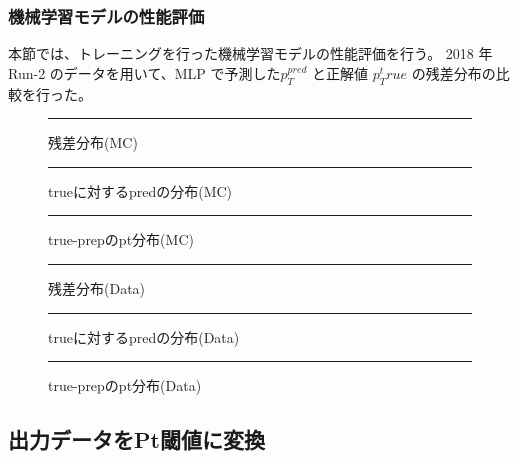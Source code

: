 \subsubsection{機械学習モデルの性能評価}
本節では、トレーニングを行った機械学習モデルの性能評価を行う。
2018 年 Run-2 のデータを用いて、MLP で予測した$p_{T}^{pred}$ と正解値 $p_{T}^true$ の残差分布の比較を行った。

\begin{figure}[tb]
  \centering
  \rule{8cm}{6cm}
  \caption{残差分布(MC)}
  \label{fig:fit_def}
\end{figure}

\begin{figure}[tb]
  \centering
  \rule{8cm}{6cm}
  \caption{trueに対するpredの分布(MC)}
  \label{fig:fit_def}
\end{figure}

\begin{figure}[tb]
  \centering
  \rule{8cm}{6cm}
  \caption{true-prepのpt分布(MC)}
  \label{fig:fit_def}
\end{figure}

\begin{figure}[tb]
  \centering
  \rule{8cm}{6cm}
  \caption{残差分布(Data)}
  \label{fig:fit_def}
\end{figure}

\begin{figure}[tb]
  \centering
  \rule{8cm}{6cm}
  \caption{trueに対するpredの分布(Data)}
  \label{fig:fit_def}
\end{figure}

\begin{figure}[tb]
  \centering
  \rule{8cm}{6cm}
  \caption{true-prepのpt分布(Data)}
  \label{fig:fit_def}
\end{figure}




\subsection{出力データをPt閾値に変換}
